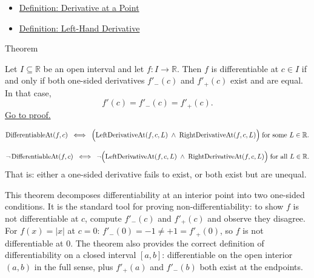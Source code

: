 \begin{dependencies}
\begin{itemize}
  \item \hyperref[def:derivative-at-a-point]{Definition: Derivative at a Point}
  \item \hyperref[def:left-hand-derivative]{Definition: Left-Hand Derivative}
\end{itemize}
\end{dependencies}


\begin{theorembox}{Theorem}
\begin{theorem}
\label{thm:differentiability-and-one-sided-derivatives}
Let $I \subseteq \mathbb{R}$ be an open interval and let $f : I \to \mathbb{R}$. Then $f$ is differentiable at $c \in I$ if and only if both one-sided derivatives $f'_-(c)$ and $f'_+(c)$ exist and are equal. In that case,
\[
f'(c) = f'_-(c) = f'_+(c).
\]
\hyperref[prf:differentiability-and-one-sided-derivatives]{Go to proof.}
\end{theorem}
\end{theorembox}

\begin{remark*}
\[
\operatorname{DifferentiableAt}(f, c)
\;\iff\;
\Bigl(\operatorname{LeftDerivativeAt}(f,c,L) \;\land\; \operatorname{RightDerivativeAt}(f,c,L)\Bigr)
\;\text{for some } L \in \mathbb{R}.
\]
\end{remark*}

\begin{remark*}
\[
\lnot\operatorname{DifferentiableAt}(f,c)
\;\iff\;
\lnot\Bigl(\operatorname{LeftDerivativeAt}(f,c,L) \;\land\; \operatorname{RightDerivativeAt}(f,c,L)\Bigr)
\;\text{for all } L \in \mathbb{R}.
\]
That is: either a one-sided derivative fails to exist, or both exist but are unequal.
\end{remark*}

\begin{remark*}[Interpretation]
This theorem decomposes differentiability at an interior point into two one-sided conditions. It is the standard tool for proving non-differentiability: to show $f$ is not differentiable at $c$, compute $f'_-(c)$ and $f'_+(c)$ and observe they disagree. For $f(x) = |x|$ at $c = 0$: $f'_-(0) = -1 \neq +1 = f'_+(0)$, so $f$ is not differentiable at $0$. The theorem also provides the correct definition of differentiability on a closed interval $[a,b]$: differentiable on the open interior $(a,b)$ in the full sense, plus $f'_+(a)$ and $f'_-(b)$ both exist at the endpoints.
\end{remark*}

